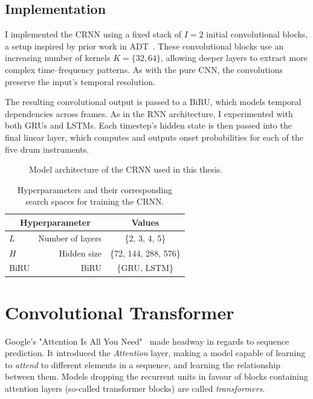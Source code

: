 \subsection{Implementation}

I implemented the \gls{CRNN} using a fixed stack of $I = 2$ initial convolutional blocks, a setup inspired by prior work in \gls{ADT}~\cite{Vogl2017DrumTV, signals4040042}. These convolutional blocks use an increasing number of kernels $K = \{32, 64\}$, allowing deeper layers to extract more complex time–frequency patterns. As with the pure \gls{CNN}, the convolutions preserve the input's temporal resolution.

The resulting convolutional output is passed to a \gls{BiRU}, which models temporal dependencies across frames. As in the \gls{RNN} architecture, I experimented with both \glspl{GRU} and \glspl{LSTM}. Each timestep's hidden state is then passed into the final linear layer, which computes and outputs onset probabilities for each of the five drum instruments.

\begin{figure}[H]
    \centering
    
    \caption{Model architecture of the \acrlong{CRNN} used in this thesis.}
    \label{CRNNFigure}
\end{figure}

\begin{table}[H]
    \centering
    \begin{tabular}{lr|c}
        \multicolumn{2}{c|}{Hyperparameter} & Values       \\
        \hline
        $L$ & Number of layers      & \{2, 3, 4, 5\} \\
        $H$ & Hidden size      & \{72, 144, 288, 576\} \\
        \gls{BiRU} & \acrlong{BiRU} & \{\gls{GRU}, \gls{LSTM}\}\\
    \end{tabular}
    \caption{Hyperparameters and their corresponding search spaces for training the \acrlong{CRNN}.}
    \label{CRNNHyperparams}
\end{table}

\section{Convolutional Transformer}

Google's "Attention Is All You Need"~\cite{NIPS2017_3f5ee243} made headway in regards to sequence prediction. It introduced the \textit{Attention} layer, making a model capable of learning to \textit{attend} to different elements in a sequence, and learning the relationship between them. Models dropping the recurrent units in favour of blocks containing attention layers (so-called transformer blocks) are called \textit{transformers}.


